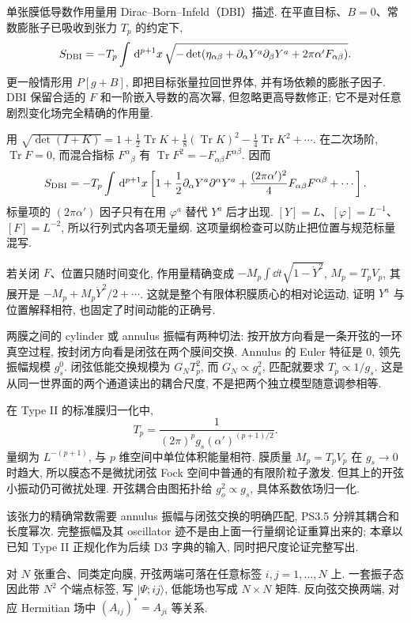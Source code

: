 单张膜低导数作用量用 Dirac--Born--Infeld（DBI）描述. 在平直目标、$B=0$、常数膨胀子已吸收到张力 $T_p$ 的约定下,
\[
S_{\rm DBI}=-T_p\int\,\mathrm d^{p+1}x\,
\sqrt{-\det(\eta_{\alpha\beta}+\partial_\alpha Y^a\partial_\beta Y^a
+2\pi\alpha'F_{\alpha\beta})}.
\]
更一般情形用 $P[g+B]$, 即把目标张量拉回世界体, 并有场依赖的膨胀子因子. DBI 保留合适的 $F$ 和一阶嵌入导数的高次幂, 但忽略更高导数修正; 它不是对任意剧烈变化场完全精确的作用量.

用 $\sqrt{\det(I+K)}=1+\tfrac12\operatorname{Tr}K
+\tfrac18(\operatorname{Tr}K)^2-\tfrac14\operatorname{Tr}K^2+\cdots$.
在二次场阶, $\operatorname{Tr}F=0$, 而混合指标 $F^\alpha{}_{\beta}$ 有 $\operatorname{Tr}F^2=-F_{\alpha\beta}F^{\alpha\beta}$. 因而
\[
S_{
\rm DBI}=-T_p\int\,\mathrm d^{p+1}x\left[
1+\frac12\partial_\alpha Y^a\partial^\alpha Y^a
+\frac{(2\pi\alpha')^2}{4}F_{\alpha\beta}F^{\alpha\beta}+\cdots\right].
\]
标量项的 $(2\pi\alpha')$ 因子只有在用 $\varphi^a$ 替代 $Y^a$ 后才出现. $[Y]=L$、$[\varphi]=L^{-1}$、$[F]=L^{-2}$, 所以行列式内各项无量纲. 这项量纲检查可以防止把位置与规范标量混写.

若关闭 $F$、位置只随时间变化, 作用量精确变成 $-M_p\int\dd t\sqrt{1-\dot Y^2}$, $M_p=T_pV_p$, 其展开是 $-M_p+M_p\dot Y^2/2+\cdots$. 这就是整个有限体积膜质心的相对论运动, 证明 $Y^a$ 与位置解释相符, 也固定了时间动能的正确号.

两膜之间的 cylinder 或 annulus 振幅有两种切法: 按开放方向看是一条开弦的一环真空过程, 按封闭方向看是闭弦在两个膜间交换. Annulus 的 Euler 特征是 0, 领先振幅规模 $g_s^0$. 闭弦低能交换规模为 $G_NT_p^2$, 而 $G_N\propto g_s^2$, 匹配就要求 $T_p\propto1/g_s$. 这是从同一世界面的两个通道读出的耦合尺度, 不是把两个独立模型随意调参相等.

在 Type II 的标准膜归一化中,
\[
T_p=\frac1{(2\pi)^pg_s(\alpha')^{(p+1)/2}}.
\]
量纲为 $L^{-(p+1)}$, 与 $p$ 维空间中单位体积能量相符. 膜质量 $M_p=T_pV_p$ 在 $g_s\to0$ 时趋大, 所以膜态不是微扰闭弦 Fock 空间中普通的有限阶粒子激发. 但其上的开弦小振动仍可微扰处理. 开弦耦合由图拓扑给 $g_o^2\propto g_s$, 具体系数依场归一化.

该张力的精确常数需要 annulus 振幅与闭弦交换的明确匹配, PS3.5 分辨其耦合和长度幂次. 完整振幅及其 oscillator 迹不是由上面一行量纲论证重算出来的; 本章以已知 Type II 正规化作为后续 D3 字典的输入, 同时把尺度论证完整写出.

对 $N$ 张重合、同类定向膜, 开弦两端可落在任意标签 $i,j=1,\ldots,N$ 上. 一套振子态因此带 $N^2$ 个端点标签, 写 $|\Psi;ij\rangle$, 低能场也写成 $N\times N$ 矩阵. 反向弦交换两端, 对应 Hermitian 场中 $(A_{ij})^*=A_{ji}$ 等关系.


